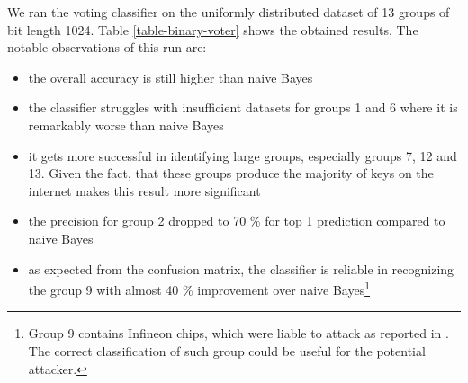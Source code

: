 We ran the voting classifier on the uniformly distributed dataset of 13 groups of bit length 1024. Table \ref{table-binary-voter} shows the obtained results. The notable observations of this run are:

\begin{itemize}

\item the overall accuracy is still higher than naive Bayes

\item the classifier struggles with insufficient datasets for groups 1 and 6 where it is remarkably worse than naive Bayes

\item it gets more successful in identifying large groups, especially groups 7, 12 and 13. Given the fact, that these groups produce the majority of keys on the internet makes this result more significant

\item the precision for group 2 dropped to 70 \% for top 1 prediction compared to naive Bayes

\item as expected from the confusion matrix, the classifier is reliable in recognizing the group 9 with almost 40 \% improvement over naive Bayes\footnote{Group 9 contains Infineon chips, which were liable to attack as reported in \cite{svenda_2}. The correct classification of such group could be useful for the potential attacker.}

\end{itemize}


